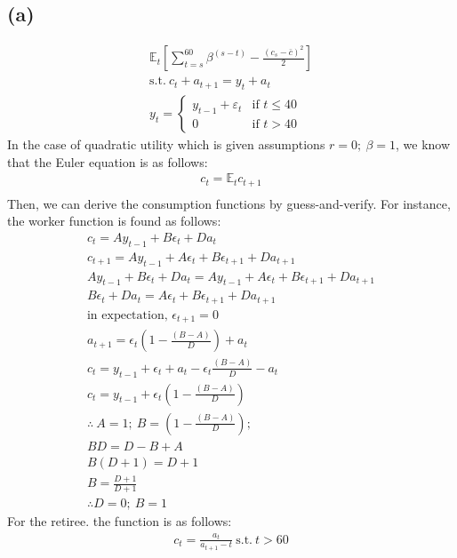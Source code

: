 \documentclass[10pt,a4paper]{article}
\newcommand{\sumtb}{\sum\limits_{t=s}^{60}}
\begin{document}
    \subsection*{(a)}
        \begin{gather*}
            \mathbb{E}_t[\sumtb\beta^{(s-t)} -\frac{(c_s-\bar{c})^2}{2}] \\
            \text{s.t.} \ c_t + a_{t+1} = y_t + a_t \\
            y_t = \begin{cases} 
            y_{t-1} + \varepsilon_t & \text{if } t \leq 40 \\
            0 & \text{if } t > 40 
            \end{cases}
        \end{gather*}
        In the case of quadratic utility which is given assumptions $r=0; \ \beta=1$, we know that the
        Euler equation is as follows:
        \begin{gather*}
            c_t = \mathbb{E}_tc_{t+1} \\
        \end{gather*}
        Then, we can derive the consumption functions by guess-and-verify. For instance, the worker
        function is found as follows:
        \begin{gather*}
            c_t = Ay_{t-1} + B\epsilon_t + Da_t \\
            c_{t+1} = Ay_{t-1} + A\epsilon_t + B\epsilon_{t+1} + Da_{t+1} \\
            Ay_{t-1} + B\epsilon_t + Da_t = Ay_{t-1} + A\epsilon_t + B\epsilon_{t+1} + Da_{t+1} \\
            B\epsilon_t + Da_t = A\epsilon_t + B\epsilon_{t+1} + Da_{t+1} \\
            \text{in expectation, $\epsilon_{t+1} = 0$} \\
            a_{t+1} = \epsilon_t(1-\frac{(B-A)}{D}) + a_t \\
            c_t = y_{t-1} + \epsilon_t + a_t - \epsilon_t\frac{(B-A)}{D} - a_t \\
            c_t = y_{t-1} + \epsilon_t(1-\frac{(B-A)}{D}) \\
            \therefore \ A = 1; \ B = (1-\frac{(B-A)}{D});  \\
            BD = D - B + A \\
            B(D + 1) = D + 1 \\
            B = \frac{D+1}{D+1} \\
            \therefore D = 0; \ B = 1
        \end{gather*}
        For the retiree. the function is as follows:
        \begin{gather*}
          c_t = \frac{a_t}{a_{t+1}-t} \ \text{s.t.} \ t > 60 
        \end{gather*}
\end{document}
